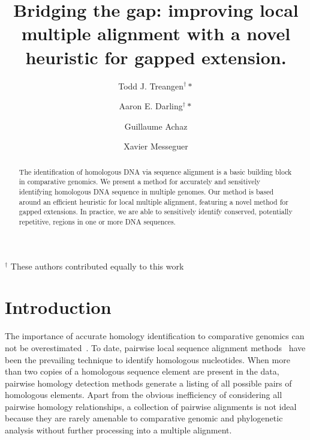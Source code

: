 \documentclass{ws-procs9x6}
\begin{document}
\title{Bridging the gap: improving local multiple alignment with a novel heuristic for gapped extension.}

\author{Todd J. Treangen$^\dag*$}

\address{Dept. of Computer Science, Technical Univ. of Catalonia\\
Barcelona, Spain\\
$^*$E-mail: treangen@lsi.upc.edu}

\author{Aaron E. Darling$^\dag*$}

\address{Institute for Molecular Bioscience, Univ. of Queensland\\
Brisbane, Australia\\
$^*$E-mail: a.darling@imb.uq.edu.au}


\author{Guillaume Achaz}

\address{Atelier de Bioinformatique, Univ. Pierre et Marie Curie-Paris 6\\
Paris, France}

\author{ Xavier Messeguer}

\address{Dept. of Computer Science, Technical Univ. of Catalonia\\
Barcelona, Spain\\
}

{\center \scriptsize $^\dag$ These authors contributed equally to this work \\}

\begin{abstract}
The identification of homologous DNA via sequence alignment is a basic building block in comparative genomics.  We present a method for accurately and sensitively identifying homologous DNA sequence in multiple genomes. Our method is based around an efficient heuristic for local multiple alignment, featuring a novel method for gapped extensions. In practice, we are able to sensitively identify conserved, potentially repetitive, regions in one or more DNA sequences.
\end{abstract}



\bodymatter

\section{Introduction}

The importance of accurate homology identification to comparative genomics can not be overestimated~\cite{Kumar07}. To date, pairwise local sequence alignment methods~\cite{ref-blastz, ref-ssearch,repseek} have been the prevailing technique to identify homologous nucleotides.  When more than two copies of a homologous sequence element are present in the data, pairwise homology detection methods generate a listing of all possible pairs of homologous elements.  Apart from the obvious inefficiency of considering all pairwise homology relationships, a collection of pairwise alignments is not ideal because they are rarely amenable to comparative genomic and phylogenetic analysis without further processing into a multiple alignment.
\end{document}
